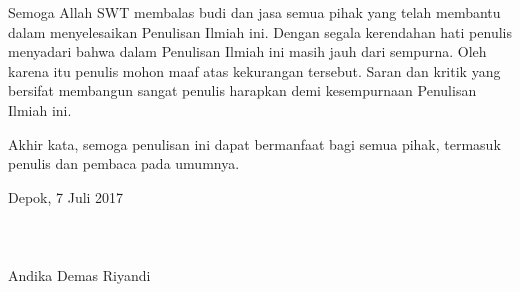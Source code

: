 \documentclass[pi.tex]{subfile}
\begin{document}
Semoga Allah SWT membalas budi dan jasa semua pihak yang telah membantu dalam menyelesaikan Penulisan Ilmiah ini. Dengan segala kerendahan hati penulis menyadari bahwa dalam Penulisan Ilmiah ini masih jauh dari sempurna. Oleh karena itu penulis mohon maaf atas kekurangan tersebut. Saran dan kritik yang bersifat membangun sangat penulis harapkan demi kesempurnaan Penulisan Ilmiah ini.

Akhir kata, semoga penulisan ini dapat bermanfaat bagi semua pihak, termasuk penulis dan pembaca pada umumnya.



Depok, 7 Juli 2017
\\
\\
\\
\\
Andika Demas Riyandi
\end{document}

